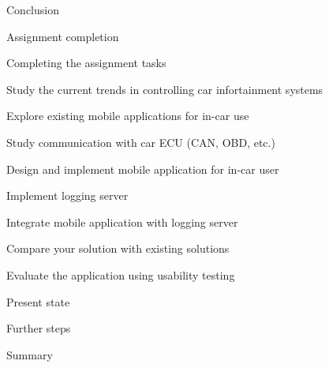 
\chap Conclusion

\sec Assignment completion

\secc Completing the assignment tasks

\seccc Study the current trends in controlling car infortainment systems

\seccc Explore existing mobile applications for in-car use

\seccc Study communication with car ECU (CAN, OBD, etc.)

\seccc Design and implement mobile application for in-car user

\seccc Implement logging server

\seccc Integrate mobile application with logging server

\seccc Compare your solution with existing solutions

\seccc Evaluate the application using usability testing

\sec Present state

\sec Further steps

\sec Summary

